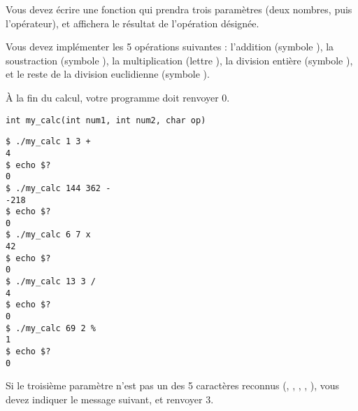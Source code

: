 

\vspace*{0.7cm}

\noindent {}

\bigskip

\noindent Vous devez écrire une fonction qui prendra trois paramètres (deux nombres, puis l'opérateur), et affichera le résultat de l'opération désignée.

\noindent Vous devez implémenter les 5 opérations suivantes : l'addition (symbole \TTBF{+}), la soustraction (symbole \TTBF{-}), la multiplication (lettre ), la division entière (symbole \TTBF{/}), et le reste de la division euclidienne (symbole \TTBF{\%}).

\noindent \`A la fin du calcul, votre programme doit renvoyer 0.

\bigskip

\lstset{language=C}
\begin{lstlisting}[frame=single,title={Prototype de la fonction}]
int my_calc(int num1, int num2, char op)
\end{lstlisting}

\bigskip

\lstset{language=sh}
\begin{lstlisting}[frame=single,title={Cas général}]
$ ./my_calc 1 3 +
4
$ echo $?
0
$ ./my_calc 144 362 -
-218
$ echo $?
0
$ ./my_calc 6 7 x
42
$ echo $?
0
$ ./my_calc 13 3 /
4
$ echo $?
0
$ ./my_calc 69 2 %
1
$ echo $?
0
\end{lstlisting}


\clearpage
\vfillFirst

\noindent Si le troisième paramètre n'est pas un des 5 caractères reconnus (\TTBF{+}, \TTBF{-}, , \TTBF{/}, \TTBF{\%}), vous devez indiquer le message suivant, et renvoyer 3.

\bigskip

\noindent {}

\noindent {}

